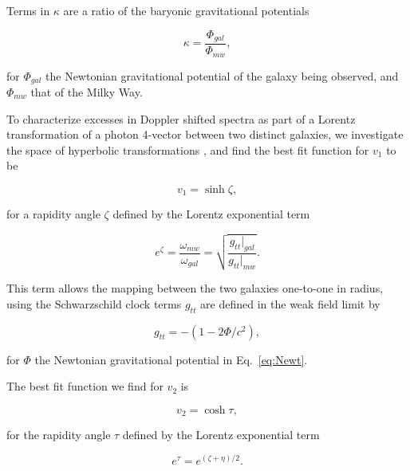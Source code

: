 \documentclass[reprint,%
 amsmath,amssymb,
 aps,
]{revtex4-1}
\begin{document}
  Terms in 
$\kappa$  are  a ratio of the baryonic gravitational potentials 

 \begin{equation}
\kappa=\frac{\Phi_{gal}}{\Phi_{mw}}, 
\label{eq:kappa2}  
\end{equation}  

 for $\Phi_{gal}$ the    Newtonian gravitational potential of the galaxy being observed, and $\Phi_{mw}$ that of  the Milky Way.  
 
 
 To characterize    excesses in Doppler shifted spectra
  as     part of  a Lorentz transformation of a photon 4-vector between two distinct galaxies, we   investigate the space of hyperbolic transformations  \cite{Cisneros:2013vha,Cisneros:2014fea,Cisneros2015,Cisn2016}, and find the best fit function for $v_1$ to be

 
 
   \begin{equation}
       v_1 = \sinh \zeta, 
       \label{eq:hyperbolica}
   \end{equation}
 
 for a rapidity angle $\zeta$  defined by the    Lorentz exponential  term  
  
   
     \begin{equation}
     e^{\zeta}=  \frac{\omega_{mw}}{\omega_{gal}}  =\sqrt{\frac{g_{tt}|_{gal}}{g_{tt}|_{mw}}}.
      \label{eq:gravRS}
    \end{equation}
    
 This term allows the  mapping
 between the two galaxies  one-to-one in radius, using the Schwarzschild clock terms $g_{tt}$  are  defined in the   weak field limit  \cite{Hartle} by
 
  \begin{equation}
      g_{tt}= -( 1 - 2\Phi/ c^2), 
      \label{clocktime}
  \end{equation} 

  for $\Phi$ the Newtonian gravitational potential in Eq.~\ref{eq:Newt}. 
  

The best fit   function we find  for  $v_2$ is 

\begin{equation}
v_{2} =  \cosh \tau, 
\label{eq:hyperbolico}
\end{equation}

 for the rapidity angle $\tau$ defined by the    Lorentz exponential  term  
  
 
\begin{equation}
    e^{\tau}=   e^{(\zeta+\eta)/2}.
\end{equation}
 
\end{document}

